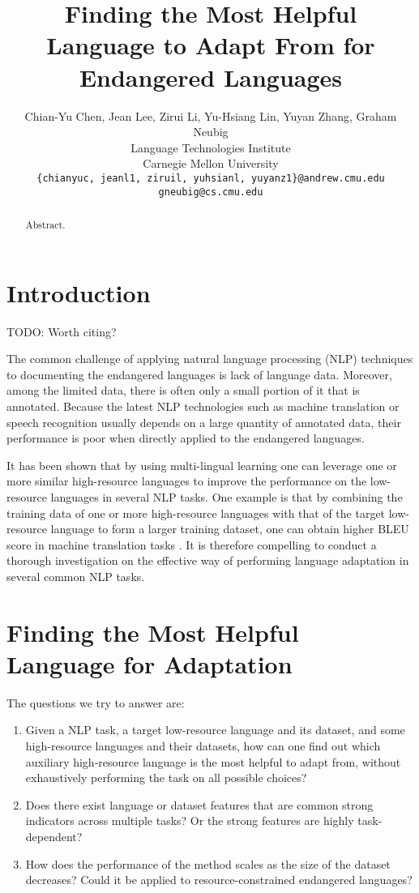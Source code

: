 \documentclass[11pt,a4paper,usenames,dvipsnames]{article}
\title{Finding the Most Helpful Language to Adapt From for Endangered Languages}
\author{Chian-Yu Chen, Jean Lee, Zirui Li, Yu-Hsiang Lin, Yuyan Zhang, Graham Neubig \\
  Language Technologies Institute \\
  Carnegie Mellon University \\
  {\tt \{chianyuc, jeanl1, ziruil, yuhsianl, yuyanz1\}@andrew.cmu.edu} \\
  {\tt gneubig@cs.cmu.edu} \\}
\date{}
\begin{document}
\maketitle
\begin{abstract}
{\color{blue}Abstract.}
\end{abstract}

\section{Introduction}

TODO: Worth citing? \cite{kocmi2018trivial}

The common challenge of applying natural language processing (NLP) techniques to documenting the endangered languages is lack of language data. Moreover, among the limited data, there is often only a small portion of it that is annotated. Because the latest NLP technologies such as machine translation or speech recognition usually depends on a large quantity of annotated data, their performance is poor when directly applied to the endangered languages.

It has been shown that by using multi-lingual learning one can leverage one or more similar high-resource languages to improve the performance on the low-resource languages in several NLP tasks. One example is that by combining the training data of one or more high-resource languages with that of the target low-resource language to form a larger training dataset, one can obtain higher BLEU score in machine translation tasks \citep{Neubig2018}. It is therefore compelling to conduct a thorough investigation on the effective way of performing language adaptation in several common NLP tasks.


\section{Finding the Most Helpful Language for Adaptation}

The questions we try to answer are:

\begin{enumerate}

\item Given a NLP task, a target low-resource language and its dataset, and some high-resource languages and their datasets, how can one find out which auxiliary high-resource language is the most helpful to adapt from, without exhaustively performing the task on all possible choices?

\item Does there exist language or dataset features that are common strong indicators across multiple tasks? Or the strong features are highly task-dependent?

\item How does the performance of the method scales as the size of the dataset decreases? Could it be applied to resource-constrained endangered languages?

\end{enumerate}
\end{document}
